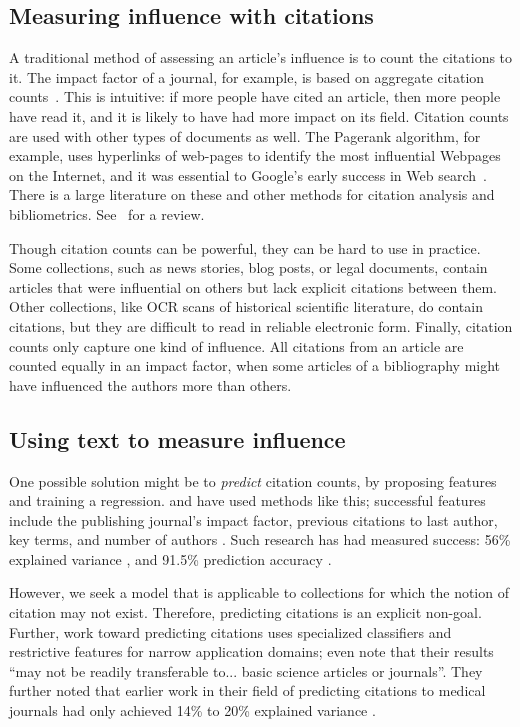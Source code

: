 \subsection*{Measuring influence with citations}

A traditional method of assessing an article's influence is to count
the citations to it. The impact factor of a journal, for example, is
based on aggregate citation counts~\citep{garfield:2002}.  This is
intuitive: if more people have cited an article, then more people have
read it, and it is likely to have had more impact on its field.
Citation counts are used with other types of documents as well.  The
Pagerank algorithm, for example, uses hyperlinks of web-pages to
identify the most influential Webpages on the Internet, and it was
essential to Google's early success in Web search~\citep{brin:1998}.
There is a large literature on these and other methods for citation
analysis and bibliometrics.  See~\citep{osareh:1996} for a review.

Though citation counts can be powerful, they can be hard to use in
practice.  Some collections, such as news stories, blog posts, or
legal documents, contain articles that were influential on others but
lack explicit citations between them.  Other collections, like OCR
scans of historical scientific literature, do contain citations, but
they are difficult to read in reliable electronic form.  Finally,
citation counts only capture one kind of influence.  All citations
from an article are counted equally in an impact factor, when some
articles of a bibliography might have influenced the authors more than
others.

\subsection*{Using text to measure influence}

One possible solution might be to \emph{predict} citation counts, by
proposing features and training a regression. \cite{tang:2009} and
\cite{lokker:2008} have used methods like this; successful features include
the publishing journal's impact factor, previous citations to last
author, key terms, and number of authors
\citep{tang:2009,lokker:2008}.  Such research has had measured
success: 56\% explained variance \citep{lokker:2008}, and 91.5\%
prediction accuracy \citep{ibanez:2009}.

However, we seek a model that is applicable to collections for which
the notion of citation may not exist.  Therefore, predicting citations
is an explicit non-goal.  Further, work toward predicting citations
uses specialized classifiers and restrictive features for narrow
application domains; \cite{lokker:2008} even note that their results
``may not be readily transferable to... basic science articles or
journals''. They further noted that earlier work in their field of
predicting citations to medical journals had only achieved 14\% to
20\% explained variance \citep{lokker:2008}.

